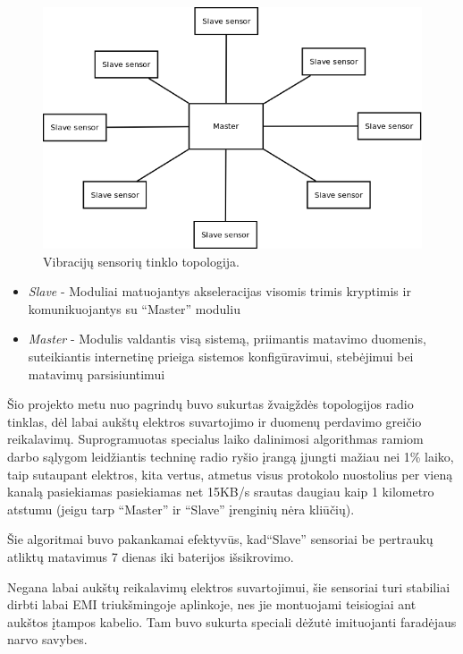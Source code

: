 \documentclass[12pt, a4paper, lithuanian, final]{article}
\begin{document}
\begin{figure}[H]
\begin{center}
\includegraphics[width=1\textwidth]{img/NorgeRail_star.png}
\caption{Vibracijų sensorių tinklo topologija.}
\end{center}
\end{figure}

\begin{itemize}
	\item \textit{Slave} - Moduliai matuojantys akseleracijas visomis trimis kryptimis ir komunikuojantys su "`Master"' moduliu
	\item \textit{Master} - Modulis valdantis visą sistemą, priimantis matavimo duomenis, suteikiantis internetinę prieiga sistemos konfigūravimui, stebėjimui bei matavimų parsisiuntimui
\end{itemize}

Šio projekto metu nuo pagrindų buvo sukurtas žvaigždės topologijos radio tinklas, dėl labai aukštų elektros suvartojimo ir duomenų perdavimo greičio reikalavimų.
Suprogramuotas specialus laiko dalinimosi algorithmas ramiom darbo sąlygom leidžiantis techninę radio ryšio įrangą įjungti mažiau nei 1\% laiko, taip sutaupant elektros, kita vertus, atmetus visus protokolo nuostolius per vieną kanalą pasiekiamas pasiekiamas net 15KB/s srautas daugiau kaip 1 kilometro atstumu (jeigu tarp "`Master"' ir "`Slave"' įrenginių nėra kliūčių).

Šie algoritmai buvo pakankamai efektyvūs, kad"`Slave"' sensoriai be pertraukų atliktų matavimus 7 dienas iki baterijos išsikrovimo.


Negana labai aukštų reikalavimų elektros suvartojimui, šie sensoriai turi stabiliai dirbti labai EMI triukšmingoje aplinkoje, nes jie montuojami teisiogiai ant aukštos įtampos kabelio.
Tam buvo sukurta speciali dėžutė imituojanti faradėjaus narvo savybes.
\end{document}
